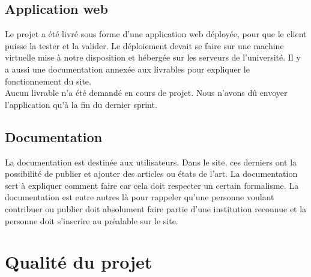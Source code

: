 \documentclass[t, 12pt, usenames,dvipsnames]{article}
\begin{document}
        \subsection{Application web}
            \noindent Le projet a été livré sous forme d'une application web déployée, pour que le client puisse la tester et la valider. Le déploiement devait se faire sur une machine virtuelle mise à notre disposition et hébergée sur les serveurs de l'université. Il y a aussi une documentation annexée aux livrables pour expliquer le fonctionnement du site.\\
            Aucun livrable n'a été demandé en cours de projet. Nous n'avons dû envoyer l'application qu'à la fin du dernier sprint.
        
        \subsection{Documentation}
            \noindent La documentation est destinée aux utilisateurs. Dans le site, ces derniers ont la possibilité de publier et ajouter des articles ou états de l'art. La documentation sert à expliquer comment faire car cela doit respecter un certain formalisme. La documentation est entre autres là pour rappeler qu'une personne voulant contribuer ou publier doit absolument faire partie d'une institution reconnue et la personne doit s'inscrire au préalable sur le site.

    \section{Qualité du projet}
        
\end{document}
